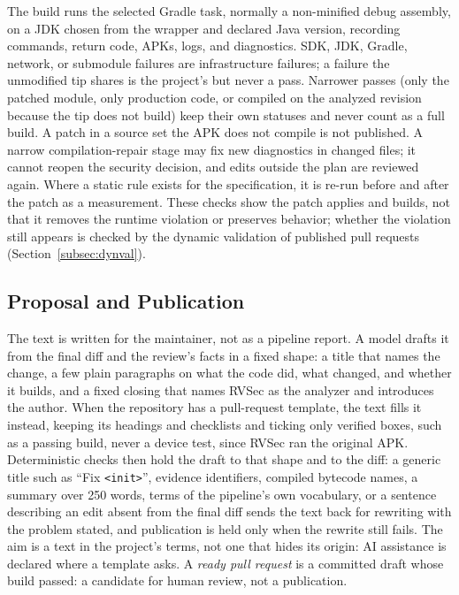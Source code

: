 \documentclass[conference]{IEEEtran}
\begin{document}
The build runs the selected Gradle task, normally a non-minified debug
assembly, on a JDK chosen from the wrapper and declared Java version, recording
commands, return code, APKs, logs, and diagnostics. SDK, JDK, Gradle, network,
or submodule failures are infrastructure failures; a failure the unmodified tip
shares is the project's but never a pass. Narrower passes (only the patched
module, only production code, or compiled on the analyzed revision because the
tip does not build) keep their own statuses and never count as a full build. A
patch in a source set the APK does not compile is not published. A narrow
compilation-repair stage may fix new diagnostics in changed files; it cannot
reopen the security decision, and edits outside the plan are reviewed again.
Where a static rule exists for the specification, it is re-run before and after
the patch as a measurement. These checks show the patch applies and builds, not
that it removes the runtime violation or preserves behavior; whether the
violation still appears is checked by the dynamic validation of published
pull requests (Section~\ref{subsec:dynval}).

\subsection{Proposal and Publication}

The text is written for the maintainer, not as a pipeline report. A model
drafts it from the final diff and the review's facts in a fixed shape: a title
that names the change, a few plain paragraphs on what the code did, what
changed, and whether it builds, and a fixed closing that names RVSec as the
analyzer and introduces the author. When the repository has a pull-request
template, the text fills it instead, keeping its headings and checklists and
ticking only verified boxes, such as a passing build, never a device test,
since RVSec ran the original APK. Deterministic checks then hold the draft to
that shape and to the diff: a generic title such as ``Fix \texttt{<init>}'',
evidence identifiers, compiled bytecode names, a summary over 250 words, terms
of the pipeline's own vocabulary, or a sentence describing an
edit absent from the final diff sends the text back for rewriting with the
problem stated, and publication is held only when the rewrite still fails.
The aim is a text in the project's terms, not one that hides its origin: AI
assistance is declared where a template asks. A \emph{ready pull request} is a committed
draft whose build passed: a candidate for human review, not a publication.
\end{document}

